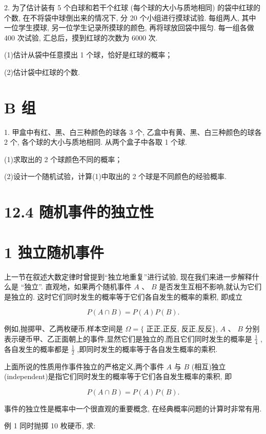 \documentclass[10pt]{article}
\begin{document}
2. 为了估计装有 5 个白球和若干个红球 (每个球的大小与质地相同) 的袋中红球的个数, 在不将袋中球倒出来的情况下, 分 20 个小组进行摸球试验. 每组两人, 其中一位学生摸球, 另一位学生记录所摸球的颜色, 再将球放回袋中摇匀. 每一组各做 400 次试验, 汇总后，摸到红球的次数为 6000 次.

(1)估计从袋中任意摸出 1 个球，恰好是红球的概率；

(2)估计袋中红球的个数.

\section*{B 组}

1. 甲盒中有红、黑、白三种颜色的球各 3 个, 乙盒中有黄、黑、白三种颜色的球各 2 个, 各个球的大小与质地相同. 从两个盒子中各取 1 个球.

(1)求取出的 2 个球颜色不同的概率；

(2)设计一个随机试验，计算(1)中取出的 2 个球是不同颜色的经验概率.

\section*{12.4 随机事件的独立性}

\section*{1 独立随机事件}

上一节在叙述大数定律时曾提到“独立地重复”进行试验, 现在我们来进一步解释什么是 “独立”. 直观地，如果两个随机事件 \(A\text{ 、 }B\) 是否发生互相不影响,就认为它们是独立的. 这时它们同时发生的概率等于它们各自发生的概率的乘积, 即成立

\[
P\left( {A \cap  B}\right)  = P\left( A\right) P\left( B\right) .
\]

例如,抛掷甲、乙两枚硬币,样本空间是 \(\Omega  = \{\) 正正,正反, 反正,反反\}, \(A\text{ 、 }B\) 分别表示硬币甲、乙正面朝上的事件,显然它们是独立的,而且它们同时发生的概率是 \(\frac{1}{4}\) ,各自发生的概率都是 \(\frac{1}{2}\) ,即同时发生的概率等于各自发生概率的乘积.

上面所说的性质用作事件独立的严格定义,两个事件 \(A\) 与 \(B\) (相互)独立(independent)是指它们同时发生的概率等于它们各自发生概率的乘积, 即

\[
P\left( {A \cap  B}\right)  = P\left( A\right) P\left( B\right) .
\]

事件的独立性是概率中一个很直观的重要概念, 在经典概率问题的计算时非常有用.

例 1 同时抛掷 10 枚硬币, 求:
\end{document}
